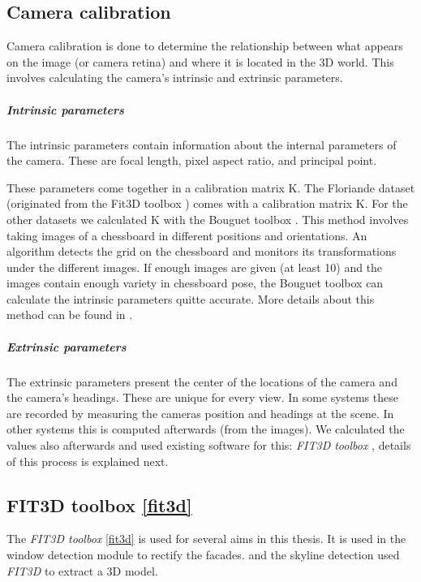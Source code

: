 \subsection{Camera calibration}
\label{sec:cameraCalibration}
Camera calibration is done to determine
the relationship between what appears on the image (or camera retina) and where
 it is located in the 3D world. This involves calculating the camera's intrinsic
 and extrinsic parameters.

\subparagraph{Intrinsic parameters}
The intrinsic parameters contain information about the internal parameters
of the camera.  These are focal length, pixel aspect ratio, and principal point.

These parameters come together in a calibration matrix K.  The Floriande
dataset (originated from the Fit3D toolbox \cite{Fit3d}) comes with a
calibration matrix K.  For
the other datasets we calculated K with the Bouguet toolbox
\cite{bouguet}.
This method involves taking images of a chessboard in different positions and
orientations. An algorithm detects the grid on the chessboard and monitors its
transformations under the different images.  If enough images are given (at
least 10) and the images contain enough variety in chessboard pose, the Bouguet
toolbox can calculate the intrinsic parameters quitte accurate.
More details about this method can be found in \cite{bouguet}.

\subparagraph{Extrinsic parameters}
The extrinsic parameters present the center of the locations of the camera
and the camera's headings. These are unique for every view.
In some systems these are recorded by measuring the cameras position and
headings at the scene. In other systems this is computed afterwards (from the
images).  We calculated the values also afterwards and used existing software for
this: \emph{FIT3D toolbox} \cite{Fit3d}, details of this process is
explained next.


\subsection{FIT3D toolbox \ref{fit3d}}
\label{sec:prelimFIT3D}
The \emph{FIT3D toolbox} \ref{fit3d} is used for several aims in this thesis.
It is used in the window detection module to rectify the facades.
and the skyline detection used \emph{FIT3D} to extract a 3D model.

